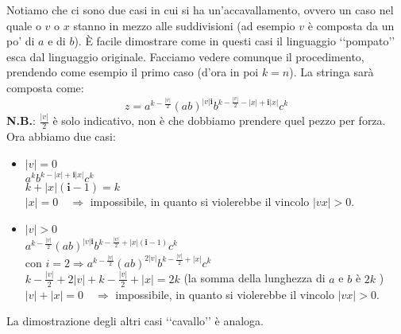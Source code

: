 \documentclass[a4paper,oneside]{scrbook}
\begin{document}
\begin{center}
\end{center}
Notiamo che ci sono due casi in cui si ha un'accavallamento, ovvero un caso nel quale o $v$ o $x$
stanno in mezzo alle suddivisioni (ad esempio $v$ è composta da un po' di $a$ e di $b$).
È facile dimostrare come in questi casi il linguaggio ‘‘pompato’’ esca dal linguaggio originale.
Facciamo vedere comunque il procedimento, prendendo come esempio il primo caso (d'ora in poi $k=n$). La stringa sarà composta come:
\begin{equation*}
	z=a^{k-\frac{|v|}{2}}(ab)^{|v|\textbf{i}}b^{k-\frac{|v|}{2}-|x|+\textbf{i}|x|}c^k
\end{equation*}
\textbf{N.B.}: $\frac{|v|}{2}$ è solo indicativo, non è che dobbiamo prendere quel pezzo per forza.
Ora abbiamo due casi:
\begin{itemize}
	\item $|v|=0$\\
	$a^kb^{k-|x|+\textbf{i}|x|}c^k$\\
	$k+|x|(\textbf{i}-1)=k$\\
	$|x|=0 \quad \Rightarrow$ impossibile, in quanto si violerebbe il vincolo $|vx|>0$.
	
	\item $|v|>0$\\
	$a^{k-\frac{|v|}{2}}(ab)^{|v|\textbf{i}}b^{k-\frac{|v|}{2}+|x|(\textbf{i}-1)}c^k$\\
	con $i=2 \Rightarrow a^{k-\frac{|v|}{2}}(ab)^{2|v|}b^{k-\frac{|v|}{2}+|x|}c^k$\\
	$k-\frac{|v|}{2}+2|v|+k-\frac{|v|}{2}+|x|=2k$ (la somma della lunghezza di $a$ e $b$ è $2k$ )\\
	$|v|+|x|=0 \quad \Rightarrow$ impossibile, in quanto si violerebbe il vincolo $|vx|>0$.
\end{itemize}
La dimostrazione degli altri casi ‘‘cavallo’’ è analoga.
\end{document}
